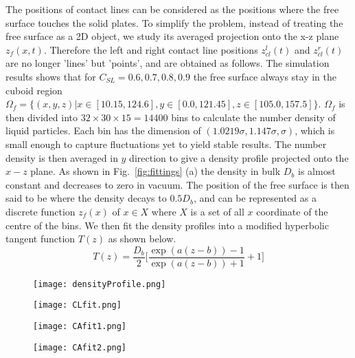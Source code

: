 \documentclass[
reprint,
 amsmath,amssymb,
 aps,
url
]{revtex4-1}
\begin{document}
The positions of contact lines can be considered as the positions where the free surface touches the solid plates. To simplify the problem, instead of treating the free surface as a 2D object, we study its averaged projection onto the x-z plane $z_f(x,t)$. Therefore the left and right contact line positions $z_{cl}^l(t)$ and $z_{cl}^r(t)$ are no longer 'lines' but 'points', and are obtained as follows. The simulation results shows that for $C_{SL}=0.6,0.7,0.8,0.9$ the free surface always stay in the cuboid region $\Omega_f=\{(x,y,z)|x\in[10.15,124.6],y\in[0.0,121.45],z\in[105.0,157.5]\}$. $\Omega_f$ is then divided into $32\times30\times15=14400$ bins to calculate the number density of liquid particles. Each bin has the dimension of $(1.0219\sigma,1.147\sigma,\sigma)$, which is small enough to capture fluctuations yet to yield stable results. The number density is then averaged in $y$ direction to give a density profile projected onto the $x-z$ plane. As shown in Fig.~\ref{fig:fittings} (a) the density in bulk $D_b$ is almost constant and decreases to zero in vacuum. The position of the free surface is then said to be where the density decays to $0.5 D_b$, and can be represented as a discrete function $z_f(x)$ of $x\in X$ where $X$ is a set of all $x$ coordinate of the centre of the bins. We then fit the density profiles into a modified hyperbolic tangent function $T(z)$ as shown below.
\begin{equation}
	\label{eq:tanh}
	T(z) = \frac{D_b}{2}\big[\frac{\exp(a(z-b))-1}{\exp(a(z-b))+1}+1\big]
\end{equation}
\begin{figure*}
	\centering
	\begin{subfigure}[b]{0.49\linewidth}
		\caption{}
		\texttt{[image: densityProfile.png]}
	\end{subfigure}	
	\begin{subfigure}[b]{0.49\linewidth}
		\caption{}
		\texttt{[image: CLfit.png]}
	\end{subfigure}
	\begin{subfigure}[b]{0.49\linewidth}
		\caption{}
		\texttt{[image: CAfit1.png]}
	\end{subfigure}
	\begin{subfigure}[b]{0.49\linewidth}
		\caption{}
		\texttt{[image: CAfit2.png]}
	\end{subfigure}
	\caption{\label{fig:fittings} Fitting to instantaneous contact line position and contact angle. The coupling coefficient is $C_{sl}=0.9$. (a) shows the density profile of the liquid after being averaged in the $y$ direction. In (b) we fit the density profile of the liquid layer nearest the left (west) wall using a hyperbolic tangent function as shown in Eq.~\ref{eq:tanh} to calculate the contact line position $z_{cl}$. In (c) and (d) we fit the free surface position to parabolic functions as shown in Eq.~\ref{eq:parabolic} to calculate the left and right contact angles, $\theta_l$ and $\theta_r$. Each fitting uses $15$ points. Results are $\theta_l=67.19\degree$ and $\theta_r=66.96\degree$. Note in the figure the scale of $x$ is larger than the scale of $z$. }
\end{figure*}
\end{document}
